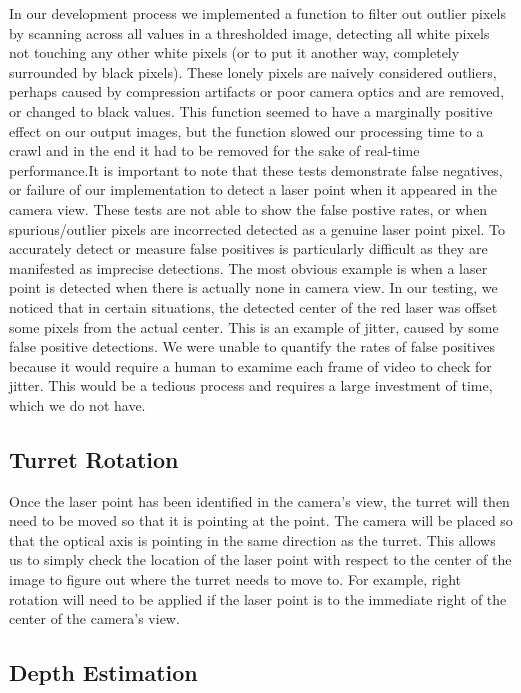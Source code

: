 \documentclass[10pt,twocolumn,letterpaper]{article}
\begin{document}
In our development process we implemented a function to filter out outlier pixels by scanning across all values in a thresholded image, detecting all white pixels not touching any other white pixels (or to put it another way, completely surrounded by black pixels).  These lonely pixels are naively considered outliers, perhaps caused by compression artifacts or poor camera optics and are removed, or changed to black values.  This function seemed to have a marginally positive effect on our output images, but the function slowed our processing time to a crawl and in the end it had to be removed for the sake of real-time performance.It is important to note that these tests demonstrate false negatives, or failure of our implementation to detect a laser point when it appeared in the camera view.  These tests are not able to show the false postive rates, or when spurious/outlier pixels are incorrected detected as a genuine laser point pixel.  To accurately detect or measure false positives is particularly difficult as they are manifested as imprecise detections.  The most obvious example is when a laser point is detected when there is actually none in camera view.  In our testing, we noticed that in certain situations, the detected center of the red laser was offset some pixels from the actual center.  This is an example of jitter, caused by some false positive detections.  We were unable to quantify the rates of false positives because it would require a human to examime each frame of video to check for jitter.  This would be a tedious process and requires a large investment of time, which we do not have.

\subsection{Turret Rotation}

Once the laser point has been identified in the camera's view, the turret will then need to be moved so that it is pointing at the point. The camera will be placed so that the optical axis is pointing in the same direction as the turret. This allows us to simply check the location of the laser point with respect to the center of the image to figure out where the turret needs to move to. For example, right rotation will need to be applied if the laser point is to the immediate right of the center of the camera's view.

\subsection{Depth Estimation}
\end{document}
